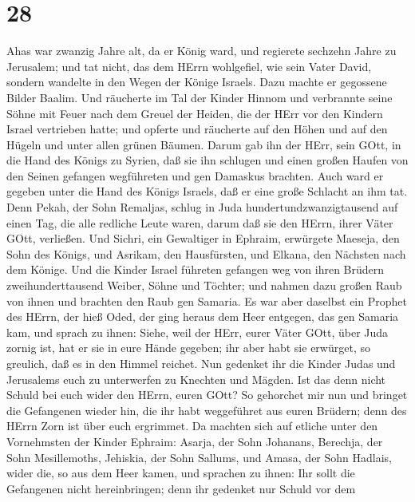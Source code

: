 \hypertarget{section-27}{%
\section{28}\label{section-27}}

 Ahas war zwanzig Jahre alt, da er König ward, und regierete
sechzehn Jahre zu Jerusalem; und tat nicht, das dem HErrn wohlgefiel,
wie sein Vater David,  sondern wandelte in den Wegen der
Könige Israels. Dazu machte er gegossene Bilder Baalim.  Und
räucherte im Tal der Kinder Hinnom und verbrannte seine Söhne mit Feuer
nach dem Greuel der Heiden, die der HErr vor den Kindern Israel
vertrieben hatte;  und opferte und räucherte auf den Höhen
und auf den Hügeln und unter allen grünen Bäumen.  Darum gab
ihn der HErr, sein GOtt, in die Hand des Königs zu Syrien, daß sie ihn
schlugen und einen großen Haufen von den Seinen gefangen wegführeten und
gen Damaskus brachten. Auch ward er gegeben unter die Hand des Königs
Israels, daß er eine große Schlacht an ihm tat.  Denn Pekah,
der Sohn Remaljas, schlug in Juda hundertundzwanzigtausend auf einen
Tag, die alle redliche Leute waren, darum daß sie den HErrn, ihrer Väter
GOtt, verließen.  Und Sichri, ein Gewaltiger in Ephraim,
erwürgete Maeseja, den Sohn des Königs, und Asrikam, den Hausfürsten,
und Elkana, den Nächsten nach dem Könige.  Und die Kinder
Israel führeten gefangen weg von ihren Brüdern zweihunderttausend
Weiber, Söhne und Töchter; und nahmen dazu großen Raub von ihnen und
brachten den Raub gen Samaria.  Es war aber daselbst ein
Prophet des HErrn, der hieß Oded, der ging heraus dem Heer entgegen, das
gen Samaria kam, und sprach zu ihnen: Siehe, weil der HErr, eurer Väter
GOtt, über Juda zornig ist, hat er sie in eure Hände gegeben; ihr aber
habt sie erwürget, so greulich, daß es in den Himmel reichet.
 Nun gedenket ihr die Kinder Judas und Jerusalems euch zu
unterwerfen zu Knechten und Mägden. Ist das denn nicht Schuld bei euch
wider den HErrn, euren GOtt?  So gehorchet mir nun und
bringet die Gefangenen wieder hin, die ihr habt weggeführet aus euren
Brüdern; denn des HErrn Zorn ist über euch ergrimmet.  Da
machten sich auf etliche unter den Vornehmsten der Kinder Ephraim:
Asarja, der Sohn Johanans, Berechja, der Sohn Mesillemoths, Jehiskia,
der Sohn Sallums, und Amasa, der Sohn Hadlais, wider die, so aus dem
Heer kamen,  und sprachen zu ihnen: Ihr sollt die
Gefangenen nicht hereinbringen; denn ihr gedenket nur Schuld vor dem
